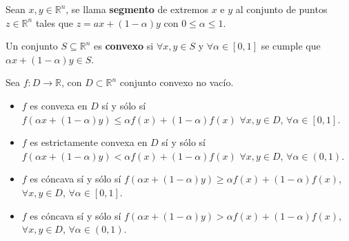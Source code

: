 \begin{Def} [Segmento]
Sean $x,y\in\mathbb{R}^{n}$, se llama \textbf{segmento} de extremos $x$ e $y$ al conjunto de puntos $z\in\mathbb{R}^{n}$ tales que $z=ax+\left(1-\alpha\right)y$ con $0\leq\alpha\leq1$.
\end{Def}

\begin{Def} [Convexo]
Un conjunto $S\subseteq\mathbb{R}^{n}$ es \textbf{convexo} si $\forall x,y\in S$ y $\forall\alpha\in\left[0,1\right]$ se cumple que $\alpha x+\left(1-\alpha\right)y\in S$.
\end{Def}


\begin{Def}  Sea $f:D\rightarrow\mathbb{R}$, con $D\subset \mathbb{R}^{n}$ conjunto convexo no vac\'io.
\begin{itemize}

\item[a) ] $f$ es convexa en $D$ s\'i y s\'olo s\'i $f\left(\alpha x +\left(1-\alpha\right)y\right)\leq\alpha f\left(x\right)+\left(1-\alpha\right)f\left(x\right)$ $\forall x,y\in D$, $\forall \alpha\in\left[0,1\right]$.

\item[b)] $f$ es estrictamente convexa en $D$ s\'i y s\'olo s\'i $f\left(\alpha x +\left(1-\alpha\right)y\right)<\alpha f\left(x\right)+\left(1-\alpha\right)f\left(x\right)$ $\forall x,y\in D$, $\forall \alpha\in\left(0,1\right)$.

\item[c) ] $f$ es c\'oncava s\'i y s\'olo s\'i $f\left(\alpha x +\left(1-\alpha\right)y\right)\geq\alpha f\left(x\right)+\left(1-\alpha\right)f\left(x\right)$, $\forall x,y\in D$, $\forall \alpha\in\left[0,1\right]$.

\item[d) ] $f$ es c\'oncava s\'i y s\'olo s\'i $f\left(\alpha x +\left(1-\alpha\right)y\right)>\alpha f\left(x\right)+\left(1-\alpha\right)f\left(x\right)$, $\forall x,y\in D$, $\forall \alpha\in\left(0,1\right)$.



\end{itemize}

\end{Def}

